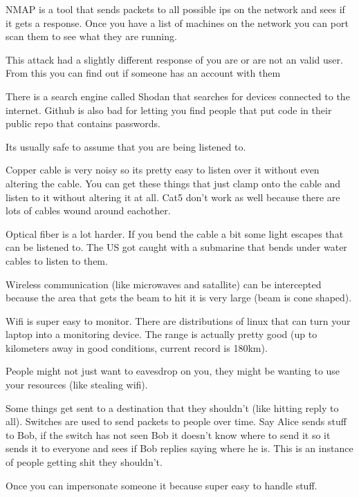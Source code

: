 \documentclass{article}
\begin{document}
NMAP is a tool that sends packets to all possible ips on the network and sees if it gets a response. Once you have a list of machines on the network you can port scan them to see what they are running. 


This attack had a slightly different response of you are or are not an valid user. From this you can find out if someone has an account with them


There is a search engine called Shodan that searches for devices connected to the internet. Github is also bad for letting you find people that put code in their public repo that contains passwords.


Its usually safe to assume that you are being listened to. 


Copper cable is very noisy so its pretty easy to listen over it without even altering the cable. You can get these things that just clamp onto the cable and listen to it without altering it at all. Cat5 don't work as well because there are lots of cables wound around eachother.

Optical fiber is a lot harder. If you bend the cable a bit some light escapes that can be listened to. The US got caught with a submarine that bends under water cables to listen to them.

Wireless communication (like microwaves and satallite) can be intercepted because the area that gets the beam to hit it is very large (beam is cone shaped). 


Wifi is super easy to monitor. There are distributions of linux that can turn your laptop into a monitoring device. The range is actually pretty good (up to kilometers away in good conditions, current record is 180km).

People might not just want to eavesdrop on you, they might be wanting to use your resources (like stealing wifi).


Some things get sent to a destination that they shouldn't (like hitting reply to all). Switches are used to send packets to people over time. Say Alice sends stuff to Bob, if the switch has not seen Bob it doesn't know where to send it so it sends it to everyone and sees if Bob replies saying where he is. This is an instance of people getting shit they shouldn't.


Once you can impersonate someone it because super easy to handle stuff. 
\end{document}
